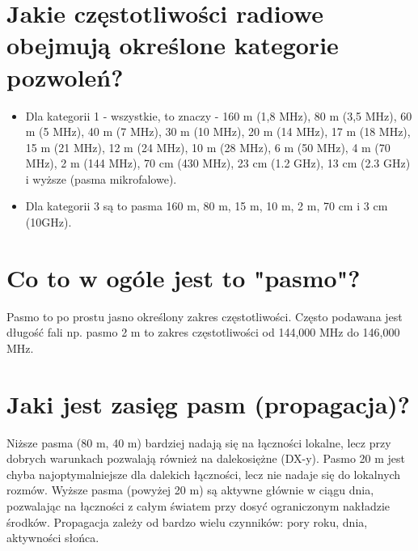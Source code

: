 \documentclass[a4paper,12pt]{article}
\begin{document}
\section{Jakie częstotliwości radiowe obejmują określone kategorie pozwoleń?}
\begin{itemize}
\item Dla kategorii 1 - wszystkie, to znaczy - 160 m (1,8 MHz), 80 m (3,5 MHz), 60 m (5 MHz), 40 m (7 MHz), 30 m (10 MHz), 20 m (14 MHz), 17 m (18 MHz), 15 m (21 MHz), 12 m (24 MHz), 10 m (28 MHz), 6 m (50 MHz), 4 m (70 MHz), 2 m (144 MHz), 70 cm (430 MHz), 23 cm (1.2 GHz), 13 cm (2.3 GHz) i wyższe (pasma mikrofalowe). 
\item Dla kategorii 3 są to pasma 160 m, 80 m, 15 m, 10 m, 2 m, 70 cm i 3 cm (10GHz).\end{itemize}


\section{Co to w ogóle jest to "pasmo"?}
Pasmo to po prostu jasno określony zakres częstotliwości. Często podawana jest długość fali np. pasmo 2 m to zakres częstotliwości od 144,000 MHz do 146,000 MHz.

\section{Jaki jest zasięg pasm (propagacja)?}
Niższe pasma (80 m, 40 m) bardziej nadają się na łączności lokalne, lecz przy dobrych warunkach pozwalają również na dalekosiężne (DX-y). Pasmo 20 m jest chyba najoptymalniejsze dla dalekich łączności, lecz nie nadaje się do lokalnych rozmów. Wyższe pasma (powyżej 20 m) są aktywne głównie w ciągu dnia, pozwalając na łączności z całym światem przy dosyć ograniczonym nakładzie środków. Propagacja zależy od bardzo wielu czynników: pory roku, dnia, aktywności słońca. 
\end{document}
